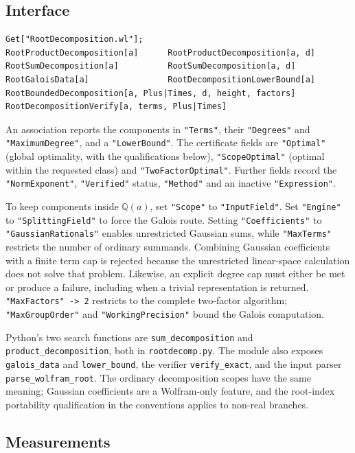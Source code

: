 \documentclass[11pt,a4paper]{article}
\theoremstyle{definition}
\theoremstyle{remark}
\newcommand{\Q}{\mathbb{Q}}
\newcommand{\code}[1]{\texttt{#1}}
\begin{document}
\subsection{Interface}

\begin{lstlisting}
Get["RootDecomposition.wl"];
RootProductDecomposition[a]      RootProductDecomposition[a, d]
RootSumDecomposition[a]          RootSumDecomposition[a, d]
RootGaloisData[a]                RootDecompositionLowerBound[a]
RootBoundedDecomposition[a, Plus|Times, d, height, factors]
RootDecompositionVerify[a, terms, Plus|Times]
\end{lstlisting}
An association reports the components in \code{"Terms"}, their \code{"Degrees"} and
\code{"MaximumDegree"}, and a \code{"LowerBound"}.  The certificate fields are \code{"Optimal"}
(global optimality, with the qualifications below), \code{"ScopeOptimal"} (optimal within the
requested class) and \code{"TwoFactorOptimal"}.  Further fields record the \code{"NormExponent"},
\code{"Verified"} status, \code{"Method"} and an inactive \code{"Expression"}.

\begin{sloppypar}
To keep components inside $\Q(a)$, set \code{"Scope"} to \code{"InputField"}.
Set \code{"Engine"} to \code{"SplittingField"} to force the Galois route.
Setting \code{"Coefficients"} to \code{"GaussianRationals"} enables unrestricted Gaussian sums, while
\code{"MaxTerms"} restricts the number of ordinary summands.  Combining Gaussian coefficients with
a finite term cap is rejected because the unrestricted linear-space calculation does not solve that
problem.  Likewise, an explicit degree cap must either be met or produce a failure, including when a
trivial representation is returned.
\code{"MaxFactors" -> 2} restricts to the complete two-factor algorithm; \code{"MaxGroupOrder"} and
\code{"WorkingPrecision"} bound the Galois computation.
\end{sloppypar}

Python's two search functions are \code{sum\_decomposition} and
\code{product\_decomposition}, both in \code{rootdecomp.py}.  The module also exposes
\code{galois\_data} and \code{lower\_bound}, the verifier \code{verify\_exact}, and the input parser
\code{parse\_wolfram\_root}.  The ordinary decomposition scopes have the same
meaning; Gaussian coefficients are a Wolfram-only feature, and the root-index portability
qualification in the conventions applies to non-real branches.

\subsection{Measurements}
\end{document}
